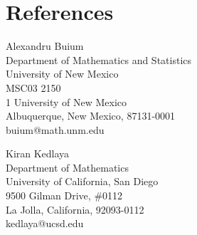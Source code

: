 \documentclass[a4paper,10pt]{article}
\begin{document}
\section*{References}


\begin{multicols}{2}
	\begin{flushleft}
		Alexandru Buium\\
		Department of Mathematics and Statistics\\
		University of New Mexico\\
		MSC03 2150\\
		1 University of New Mexico\\
		Albuquerque, New Mexico, 87131-0001\\
		buium@math.unm.edu
	\end{flushleft}
	\begin{flushleft}
		Kiran Kedlaya\\
		Department of Mathematics\\
		University of California, San Diego\\
		9500 Gilman Drive, \#0112\\
		La Jolla, California, 92093-0112\\
		kedlaya@ucsd.edu
	\end{flushleft}
\end{multicols}


\iffalse 
\begin{center}
	Thomas Scanlon\\
	Department of Mathematics\\
	University of California, Berkeley\\
	970 Evans Hall\\
	Berkeley, California, 94720-3840\\
	tws@berkeley.edu 
\end{center}
\fi 
\end{document}
